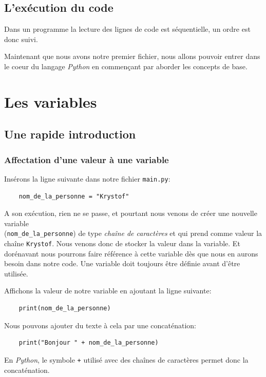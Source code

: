 \documentclass[a4paper,11pt]{book}
\begin{document}
\section{L'exécution du code}
Dans un programme la lecture des lignes de code est séquentielle, un ordre est donc suivi. 
\medskip

Maintenant que nous avons notre premier fichier, nous allons pouvoir entrer dans le coeur du langage \textit{Python} en commençant par aborder les concepts de base.
\medskip

\chapter{Les variables}
\section{Une rapide introduction}
\subsection*{Affectation d'une valeur à une variable}
Insérons la ligne suivante dans notre fichier \texttt{main.py}:
\begin{verbatim}
    nom_de_la_personne = "Krystof"
\end{verbatim}
\medskip

A son exécution, rien ne se passe, et pourtant nous venons de créer une nouvelle variable \\(\texttt{nom\_de\_la\_personne}) de type \textit{chaîne de caractères} et qui prend comme valeur la chaîne \texttt{Krystof}. Nous venons donc de stocker la valeur dans la variable. Et dorénavant nous pourrons faire référence à cette variable dès que nous en aurons besoin dans notre code. Une variable doit toujours être définie avant d'être utilisée.
\medskip

Affichons la valeur de notre variable en ajoutant la ligne suivante:
\begin{verbatim}
    print(nom_de_la_personne)
\end{verbatim}
\medskip

Nous pouvons ajouter du texte à cela par une concaténation:
\begin{verbatim}
    print("Bonjour " + nom_de_la_personne)
\end{verbatim}
En \textit{Python}, le symbole \texttt{+} utilisé avec des chaînes de caractères permet donc la concaténation.
\medskip
\end{document}
